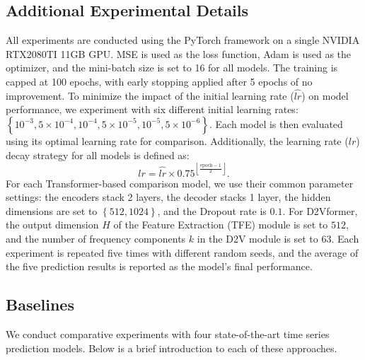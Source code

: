 \documentclass{article}
\begin{document}
\subsection{Additional Experimental Details}\label{experimental_details}


All experiments are conducted using the PyTorch framework \cite{pytorch} on a single NVIDIA RTX2080TI 11GB GPU. MSE is used as the loss function, Adam \cite{adam} is used as the optimizer, and the mini-batch size is set to 16 for all models. The training is capped at 100 epochs, with early stopping applied after 5 epochs of no improvement.
To minimize the impact of the initial learning rate ($\hat{lr}$) on model performance, we experiment with six different initial learning rates: $\left \{ 10^{-3}, 5\times10^{-4}, 10^{-4}, 5\times10^{-5}, 10^{-5}, 5\times10^{-6} \right \}$. Each model is then evaluated using its optimal learning rate for comparison.
Additionally, the learning rate ($lr$) decay strategy for all models is defined as: $$lr = \hat{lr} \times 0.75^{\left \lfloor \frac{\text{epoch}-1}{2}\right \rfloor}.$$
For each Transformer-based comparison model, we use their common parameter settings: the encoders stack 2 layers, the decoder stacks 1 layer, the hidden dimensions are set to $\left\{ 512, 1024 \right\}$, and the Dropout rate is $0.1$. For D2Vformer, the output dimension $H$ of the Feature Extraction (TFE) module is set to $512$, and the number of frequency components $k$ in the D2V module is set to $63$. Each experiment is repeated five times with different random seeds, and the average of the five prediction results is reported as the model's final performance.


\subsection{Baselines}\label{baselines}

We conduct comparative experiments with four state-of-the-art time series prediction models. Below is a brief introduction to each of these approaches.
\end{document}
